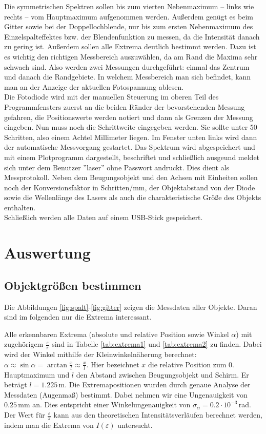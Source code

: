 \documentclass[12pt,a4paper,titlepage,headinclude,bibtotoc]{scrartcl}
\begin{document}
Die symmetrischen Spektren sollen bis zum vierten Nebenmaximum -- links wie rechts -- vom Hauptmaximum aufgenommen werden.
Außerdem genügt es beim Gitter sowie bei der Doppellochblende, nur bis zum ersten Nebenmaximum des Einzelspalteffektes bzw. der Blendenfunktion zu messen, da die Intensität danach zu gering ist.
Außerdem sollen alle Extrema deutlich bestimmt werden.
Dazu ist es wichtig den richtigen Messbereich auszuwählen, da am Rand die Maxima sehr schwach sind.
Also werden zwei Messungen durchgeführt: einmal das Zentrum und danach die Randgebiete.
In welchem Messbereich man sich befindet, kann man an der Anzeige der aktuellen Fotospannung ablesen.\\

Die Fotodiode wird mit der  manuellen Steuerung im oberen Teil des Programmfensters zuerst an die beiden Ränder der bevorstehenden Messung gefahren, die Positionswerte werden notiert und dann als Grenzen der Messung eingeben.
Nun muss noch die Schrittweite eingegeben werden.
Sie sollte unter 50 Schritten, also einem Achtel Millimeter liegen.
Im Fenster unten links wird dann der automatische Messvorgang gestartet.
Das Spektrum wird abgespeichert und mit einem Plotprogramm dargestellt, beschriftet und schließlich ausgeund meldet sich unter dem Benutzer ''laser'' ohne Passwort andruckt.
Dies dient als Messprotokoll.
Neben dem Beugungsobjekt und den Achsen mit Einheiten sollen noch der Konversionsfaktor in Schritten/mm, der Objektabstand von der Diode sowie die Wellenlänge des Lasers als auch die charakteristische Größe des Objekts enthalten.\\

Schließlich werden alle Daten auf einem USB-Stick gespeichert.

\section{Auswertung}
\label{sec:auswertung}
\subsection{Objektgrößen bestimmen}
Die Abbildungen \ref{fig:spalt}-\ref{fig:gitter} zeigen die Messdaten aller Objekte.
Daran sind im folgenden nur die Extrema interessant.

Alle erkennbaren Extrema (absolute und relative Position sowie Winkel $\alpha$) mit zugehörigem $\frac{\varepsilon}{\pi}$ sind in Tabelle \ref{tab:extrema1} und \ref{tab:extrema2} zu finden.
Dabei wird der Winkel mithilfe der Kleinwinkelnäherung berechnet: $\alpha\approx\sin\alpha=\arctan\frac{x}{l}\approx\frac{x}{l}$.
Hier bezeichnet $x$ die relative Position zum 0. Hauptmaximum und $l$ den Abstand zwischen Beugungsobjekt und Schirm.
Er beträgt $l=1.225\,$m.
Die Extremapositionen wurden durch genaue Analyse der Messdaten (Augenmaß) bestimmt.
Dabei nehmen wir eine Ungenauigkeit von $0.25\,$mm an.
Dies entspricht einer Winkelungenauigkeit von $\sigma_\alpha=0.2\cdot 10^{-3}\,$rad.
Der Wert für $\frac{\varepsilon}{\pi}$ kann aus den theoretischen Intensitätsverläufen berechnet werden, indem man die Extrema von $I(\varepsilon)$ untersucht.
\end{document}
